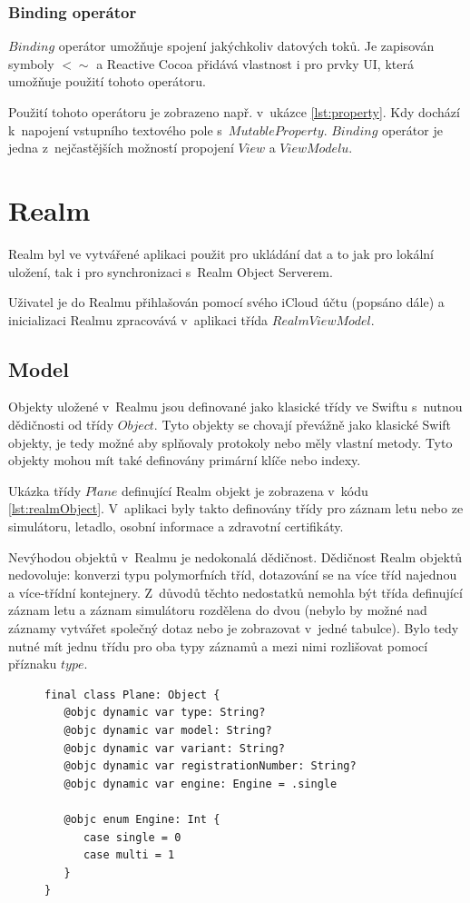\documentclass[thesis=M,czech]{FITthesis}[2012/06/26]
\begin{document}
\subsubsection{Binding operátor}
$Binding$ operátor umožňuje spojení jakýchkoliv datových toků. Je zapisován symboly $<\sim$  a Reactive Cocoa přidává vlastnost i pro prvky UI, která umožňuje použití tohoto operátoru. \cite{ReactiveCocoa}

Použití tohoto operátoru je zobrazeno např. v~ukázce \ref{lst:property}. Kdy dochází k~napojení vstupního textového pole s~$MutableProperty$. $Binding$ operátor je jedna z~nejčastějších možností propojení $View$ a $ViewModelu$.

\section{Realm}
Realm byl ve vytvářené aplikaci použit pro ukládání dat a to jak pro lokální uložení, tak i pro synchronizaci s~Realm Object Serverem. 

Uživatel je do Realmu přihlašován pomocí svého iCloud účtu (popsáno dále) a inicializaci Realmu zpracovává v~aplikaci třída $RealmViewModel$.
	
\subsection{Model}
Objekty uložené v~Realmu jsou definované jako klasické třídy ve Swiftu s~nutnou dědičnosti od třídy $Object$. Tyto objekty se chovají převážně jako klasické Swift objekty, je tedy možné aby splňovaly protokoly nebo měly vlastní metody. Tyto objekty mohou mít také definovány primární klíče nebo indexy. 

Ukázka třídy $Plane$ definující Realm objekt je zobrazena v~kódu \ref{lst:realmObject}. V~aplikaci byly takto definovány třídy pro záznam letu nebo ze simulátoru, letadlo, osobní informace a zdravotní certifikáty.

Nevýhodou objektů v~Realmu je nedokonalá dědičnost. Dědičnost Realm objektů nedovoluje: konverzi typu polymorfních tříd, dotazování se na více tříd najednou a více-třídní kontejnery. \cite{realmDocs} Z~důvodů těchto nedostatků nemohla být třída definující záznam letu a záznam simulátoru rozdělena do dvou (nebylo by možné nad záznamy vytvářet společný dotaz nebo je zobrazovat v~jedné tabulce). Bylo tedy nutné mít jednu třídu pro oba typy záznamů a mezi nimi rozlišovat pomocí příznaku $type$.

\begin{figure}
\begin{minipage}{\linewidth}
\begin{lstlisting}[caption={Ukázka modelu Plane},label={lst:realmObject}]
final class Plane: Object {
   @objc dynamic var type: String?
   @objc dynamic var model: String?
   @objc dynamic var variant: String?
   @objc dynamic var registrationNumber: String?
   @objc dynamic var engine: Engine = .single
    
   @objc enum Engine: Int {
      case single = 0
      case multi = 1
   }
}
\end{lstlisting}
\end{minipage}
\end{figure}
\end{document}
